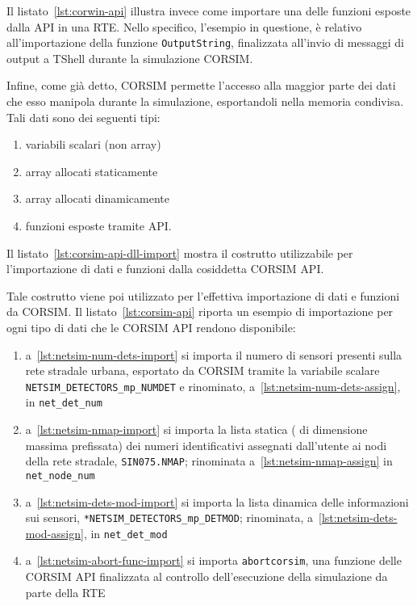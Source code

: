 Il listato~\ref{lst:corwin-api} illustra invece come importare una delle funzioni esposte dalla  \acs{API} in una \acs{RTE}. Nello specifico, l'esempio in questione, è relativo all'importazione della funzione \lstinline[]|OutputString|, finalizzata all'invio di messaggi di output a \acs{TShell} durante la simulazione \acs{CORSIM}.

\vspace*{8pt}

Infine, come già detto, \acs{CORSIM} permette l'accesso alla maggior parte dei dati che esso manipola durante la simulazione, esportandoli nella memoria condivisa. Tali dati sono dei seguenti tipi:
\begin{enumerate}
    \item variabili scalari (non array)
    \item array allocati staticamente
    \item array allocati dinamicamente
    \item funzioni esposte tramite \acs{API}.
\end{enumerate}

Il listato~\ref{lst:corsim-api-dll-import} mostra il costrutto utilizzabile per l'importazione di dati e funzioni dalla cosiddetta \acs{CORSIM} \acs{API}.
\vspace*{8pt}

Tale costrutto viene poi utilizzato per l'effettiva importazione di dati e funzioni da \acs{CORSIM}. Il listato~\ref{lst:corsim-api} riporta un esempio di importazione per ogni tipo di dati che le \acs{CORSIM} \acs{API} rendono disponibile:
\begin{enumerate}
    \item a~\autoref{lst:netsim-num-dets-import} si importa il numero di sensori presenti sulla rete stradale urbana, esportato da \acs{CORSIM} tramite la variabile scalare \lstinline[]|NETSIM_DETECTORS_mp_NUMDET| e rinominato, a~\autoref{lst:netsim-num-dets-assign}, in \lstinline[]|net_det_num|
    \item a~\autoref{lst:netsim-nmap-import} si importa la lista statica (\ie{} di dimensione massima prefissata) dei numeri identificativi assegnati dall'utente ai nodi della rete stradale, \lstinline[]|SIN075.NMAP|; rinominata a~\autoref{lst:netsim-nmap-assign} in \lstinline[]|net_node_num|
    \item a~\autoref{lst:netsim-dets-mod-import} si importa la lista dinamica delle informazioni sui sensori, \lstinline[]|*NETSIM_DETECTORS_mp_DETMOD|; rinominata, a~\autoref{lst:netsim-dets-mod-assign}, in \lstinline[]|net_det_mod|
    \item a~\autoref{lst:netsim-abort-func-import} si importa \lstinline[]|abortcorsim|, una funzione delle \acs{CORSIM} \acs{API} finalizzata al controllo dell'esecuzione della simulazione da parte della \acs{RTE}
\end{enumerate}

